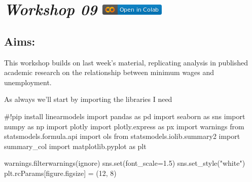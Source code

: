 \documentclass[
  letterpaper,
  DIV=11,
  numbers=noendperiod]{scrreprt}
\newenvironment{Shaded}{\begin{snugshade}}{\end{snugshade}}
\newcommand{\BuiltInTok}[1]{\textcolor[rgb]{0.00,0.23,0.31}{#1}}
\newcommand{\CommentTok}[1]{\textcolor[rgb]{0.37,0.37,0.37}{#1}}
\newcommand{\DecValTok}[1]{\textcolor[rgb]{0.68,0.00,0.00}{#1}}
\newcommand{\FloatTok}[1]{\textcolor[rgb]{0.68,0.00,0.00}{#1}}
\newcommand{\ImportTok}[1]{\textcolor[rgb]{0.00,0.46,0.62}{#1}}
\newcommand{\NormalTok}[1]{\textcolor[rgb]{0.00,0.23,0.31}{#1}}
\newcommand{\OperatorTok}[1]{\textcolor[rgb]{0.37,0.37,0.37}{#1}}
\newcommand{\StringTok}[1]{\textcolor[rgb]{0.13,0.47,0.30}{#1}}
\begin{document}
\hypertarget{workshop-09-open-in-colab}{%
\section[\emph{Workshop 09} ]{\texorpdfstring{\emph{Workshop 09}
\href{https://colab.research.google.com/github/oballinger/QM2/blob/main/notebooks/W09.\%20Difference-in-Differences.ipynb}{\protect\includegraphics{index_files/mediabag/colab-badge.png}}}{Workshop 09 Open In Colab}}\label{workshop-09-open-in-colab}}

\hypertarget{aims-6}{%
\subsection{Aims:}\label{aims-6}}

This workshop builds on last week's material, replicating analysis in
published academic research on the relationship between minimum wages
and unemployment.

As always we'll start by importing the libraries I need

\begin{Shaded}
\begin{Highlighting}[]
\CommentTok{\#!pip install linearmodels}
\ImportTok{import}\NormalTok{ pandas }\ImportTok{as}\NormalTok{ pd}
\ImportTok{import}\NormalTok{ seaborn }\ImportTok{as}\NormalTok{ sns}
\ImportTok{import}\NormalTok{ numpy }\ImportTok{as}\NormalTok{ np}
\ImportTok{import}\NormalTok{ plotly}
\ImportTok{import}\NormalTok{ plotly.express }\ImportTok{as}\NormalTok{ px}
\ImportTok{import}\NormalTok{ warnings}
\ImportTok{from}\NormalTok{ statsmodels.formula.api }\ImportTok{import}\NormalTok{ ols}
\ImportTok{from}\NormalTok{ statsmodels.iolib.summary2 }\ImportTok{import}\NormalTok{ summary\_col}
\ImportTok{import}\NormalTok{ matplotlib.pyplot }\ImportTok{as}\NormalTok{ plt}

\NormalTok{warnings.filterwarnings(}\StringTok{\textquotesingle{}ignore\textquotesingle{}}\NormalTok{)}
\NormalTok{sns.}\BuiltInTok{set}\NormalTok{(font\_scale}\OperatorTok{=}\FloatTok{1.5}\NormalTok{)}
\NormalTok{sns.set\_style(}\StringTok{"white"}\NormalTok{)}
\NormalTok{plt.rcParams[}\StringTok{\textquotesingle{}figure.figsize\textquotesingle{}}\NormalTok{] }\OperatorTok{=}\NormalTok{ (}\DecValTok{12}\NormalTok{, }\DecValTok{8}\NormalTok{)}
\end{Highlighting}
\end{Shaded}
\end{document}
